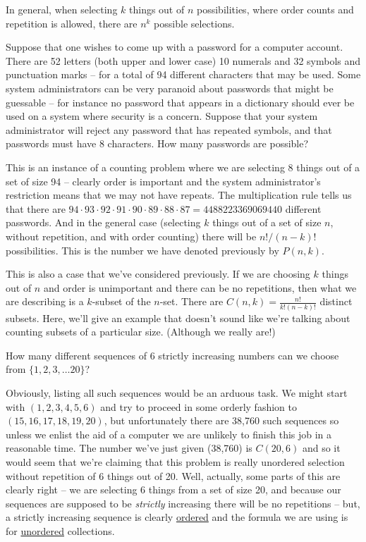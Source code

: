 In general, when selecting $k$ things out of $n$ possibilities, where order
counts and repetition is allowed, there are $n^k$ possible selections.


Suppose that one wishes to come up with a password for a computer
account.  There are 52 letters (both upper and lower case) 10 numerals
and 32 symbols and punctuation marks -- for a total of 94 different 
characters that 
may be used.  Some system administrators can be very paranoid about
passwords that might be guessable -- for instance no password that 
appears in a dictionary should ever be used on a system where security
is a concern.  Suppose that your system administrator will reject any 
password that has repeated symbols, and that passwords must have 8 
characters.  How many passwords are possible?    

This is an instance of a counting problem where we are selecting 8 things
out of a set of size 94 -- clearly order is important and the system 
administrator's restriction means that we may not have repeats.
The multiplication rule tells us that there are 
$94\cdot 93\cdot 92\cdot 91\cdot 90\cdot 89\cdot 88\cdot 87 = 4488223369069440$
different passwords.  And in the general case (selecting $k$ things out 
of a set of size $n$, without repetition, and with order counting) 
there will be $n!/(n-k)!$ possibilities.  This is the number we have 
denoted previously by $P(n,k)$.


This is also a case that we've considered previously.  If we are choosing
$k$ things out of $n$ and order is unimportant and there can be no 
repetitions, then what we are describing is a $k$-subset of the 
$n$-set.  There are $C(n,k) = \frac{n!}{k!(n-k)!}$ distinct subsets.
Here, we'll give an example that doesn't sound like we're talking
about counting subsets of a particular size. (Although we really are!)

How many different sequences of 6 strictly increasing numbers can 
we choose from $\{1, 2, 3, \ldots 20\}$?  

Obviously, listing all such sequences would be an arduous task. 
We might start with $(1,2,3,4,5,6)$ and try to proceed in some 
orderly fashion to $(15,16,17,18,19,20)$, but unfortunately there
are 38,760 such sequences so unless we enlist the aid of a computer
we are unlikely to finish this job in a reasonable time.  The number
we've just given (38,760) is $C(20,6)$ and so it would seem that we're
claiming that this problem is really unordered selection without repetition
of 6 things out of 20.   Well, actually, some parts of this are clearly
right -- we are selecting 6 things from a set of size 20, and because
our sequences are supposed to be \emph{strictly} increasing there will 
be no repetitions -- but, a strictly increasing sequence is clearly 
\underline{ordered} and the formula we are using is for \underline{unordered}
collections.

